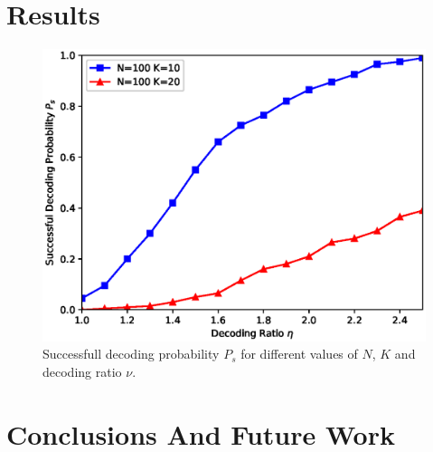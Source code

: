 \documentclass[journal]{IEEEtran}
\begin{document}
\section{Results}
\label{sec:results}
\begin{figure}
  \centering
	    \includegraphics[width=0.9\columnwidth]{ratiovsprob.eps}
  \caption{Successfull decoding probability $P_s$ for different values of $N$, $K$ and decoding ratio $\nu$.}
  \label{fig:ratiovsprob}
\end{figure}

\section{Conclusions And Future Work}
\label{sec:conclusions}



\end{document}
